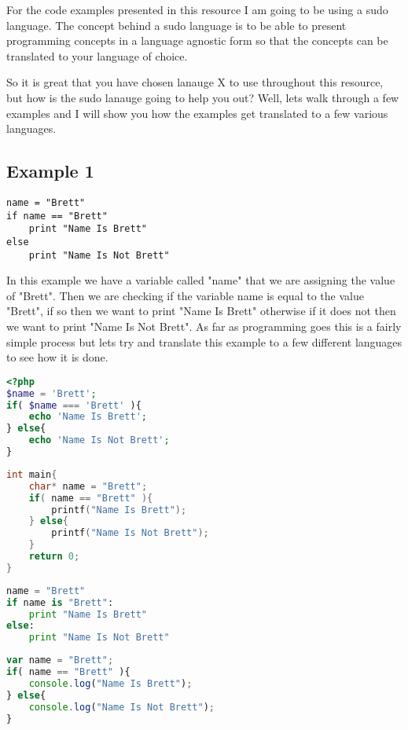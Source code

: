 For the code examples presented in this resource I am going to be using a sudo language. The concept behind a sudo language
is to be able to present programming concepts in a language agnostic form so that the concepts can be translated to your
language of choice.
\par

So it is great that you have chosen lanauge X to use throughout this resource, but how is the sudo lanauge going to help you out?
Well, lets walk through a few examples and I will show you how the examples get translated to a few various languages.

\subsection{Example 1}
\begin{lstlisting}[caption={Example 1 - Sudo Code}]
name = "Brett"
if name == "Brett"
    print "Name Is Brett"
else
    print "Name Is Not Brett"
\end{lstlisting}

In this example we have a variable called "name" that we are assigning the value of "Brett". Then we are checking if the
variable name is equal to the value "Brett", if so then we want to print "Name Is Brett" otherwise if it does not then we want to 
print "Name Is Not Brett". As far as programming goes this is a fairly simple process but lets try and translate this example
to a few different languages to see how it is done.

\begin{lstlisting}[language=php,caption={Example 1 - PHP}]
<?php
$name = 'Brett';
if( $name === 'Brett' ){
    echo 'Name Is Brett';
} else{
    echo 'Name Is Not Brett';
}
\end{lstlisting}

\begin{lstlisting}[language=c,caption={Example 1 - C}]
int main{
    char* name = "Brett";
    if( name == "Brett" ){
        printf("Name Is Brett");
    } else{
        printf("Name Is Not Brett");
    }
    return 0;
}
\end{lstlisting}

\begin{lstlisting}[language=python,caption={Example 1 - Python}]
name = "Brett"
if name is "Brett":
    print "Name Is Brett"
else:
    print "Name Is Not Brett"
\end{lstlisting}

\begin{lstlisting}[language=javascript,caption={Example 1 - Node.JS}]
var name = "Brett";
if( name == "Brett" ){
    console.log("Name Is Brett");
} else{
    console.log("Name Is Not Brett");
}
\end{lstlisting}

